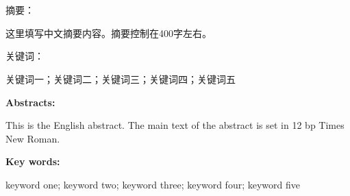 \section{} %
\noindent
{\heiti\fontsize{12bp}{18bp}\selectfont 摘要：}
{\fangsonggb\fontsize{12bp}{18bp}\selectfont
	这里填写中文摘要内容。摘要控制在400字左右。
	\par}

\vspace{0.5\baselineskip}

\noindent
{\heiti\fontsize{12bp}{18bp}\selectfont 关键词：}%
{\fangsonggb\fontsize{12bp}{18bp}\selectfont
	关键词一；关键词二；关键词三；关键词四；关键词五
	\par}

\vspace{1.5\baselineskip}

\noindent
{\tnr\bfseries\fontsize{12bp}{18bp}\selectfont Abstracts: }%
{\tnr\fontsize{12bp}{18bp}\selectfont
	This is the English abstract. The main text of the abstract is set in
	12 bp Times New Roman.
	\par}

\vspace{0.5\baselineskip}

\noindent
{\tnr\bfseries\fontsize{12bp}{18bp}\selectfont Key words: }%
{\tnr\fontsize{12bp}{18bp}\selectfont
	keyword one; keyword two; keyword three; keyword four; keyword five
	\par}